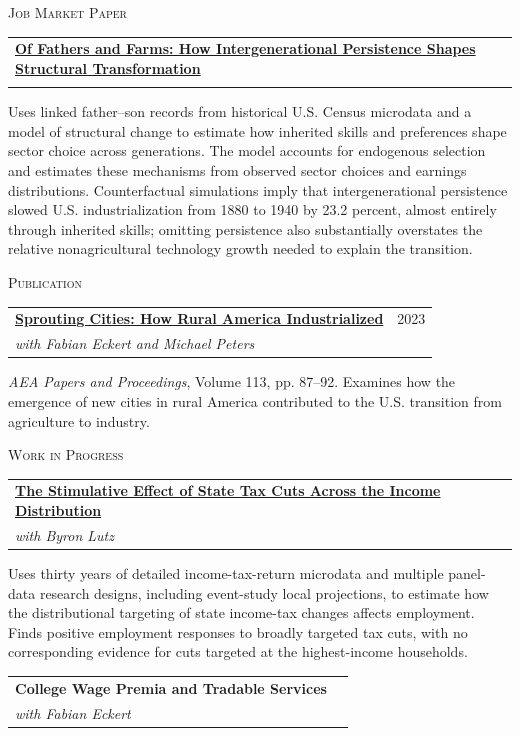 \documentclass[a4paper,11pt]{article}
\makeatletter
\renewcommand{\sectionBlock}[2]{%
  \noindent
  \begin{minipage}[t]{2.45cm}
    \raggedright #1
  \end{minipage}%
  \hspace{0.5cm}%
  \begin{minipage}[t]{\dimexpr\linewidth-3.05cm\relax}
    \raggedright #2
  \end{minipage}
  \vspace{18pt}
}
\newcommand{\researchHeading}[3]{%
  \begin{tabularx}{\linewidth}[t]{@{}Xr@{}}
    \textbf{#1} & {\small #3} \\
    \textit{#2} &
  \end{tabularx}\vspace{1pt}
}
\makeatother
\begin{document}
\sectionBlock{
}{
{\CronosLt\fontsize{12pt}{13pt}\selectfont\textsc{Job Market Paper}}\par
\vspace{3pt}
\researchHeading
  {\href{https://johnjuneau.github.io/files/of-fathers-and-farms.pdf}{Of Fathers and Farms: How Intergenerational Persistence Shapes Structural Transformation}}
  {} 
  {}
Uses linked father--son records from historical U.S. Census microdata and a model of structural change to estimate how inherited skills and preferences shape sector choice across generations. The model accounts for endogenous selection and estimates these mechanisms from observed sector choices and earnings distributions. Counterfactual simulations imply that intergenerational persistence slowed U.S. industrialization from 1880 to 1940 by 23.2 percent, almost entirely through inherited skills; omitting persistence also substantially overstates the relative nonagricultural technology growth needed to explain the transition.

\vspace{10pt}
{\CronosLt\fontsize{12pt}{13pt}\selectfont\textsc{Publication}}\par
\vspace{3pt}
\researchHeading
  {\href{https://johnjuneau.github.io/files/paper_pub_aeapandp_ejp_2023.pdf}{Sprouting Cities: How Rural America Industrialized}}
  {with Fabian Eckert and Michael Peters}
  {2023}
\textit{AEA Papers and Proceedings}, Volume 113, pp. 87--92. Examines how the emergence of new cities in rural America contributed to the U.S. transition from agriculture to industry.

\vspace{10pt}
{\CronosLt\fontsize{12pt}{13pt}\selectfont\textsc{Work in Progress}}\par
\vspace{3pt}
\researchHeading
  {\href{https://johnjuneau.github.io/files/state-tax-cuts.pdf}{The Stimulative Effect of State Tax Cuts Across the Income Distribution}}
  {with Byron Lutz}
  {}
Uses thirty years of detailed income-tax-return microdata and multiple panel-data research designs, including event-study local projections, to estimate how the distributional targeting of state income-tax changes affects employment. Finds positive employment responses to broadly targeted tax cuts, with no corresponding evidence for cuts targeted at the highest-income households.

\vspace{8pt}
\researchHeading
  {College Wage Premia and Tradable Services}
  {with Fabian Eckert}
  {}
}
\end{document}
